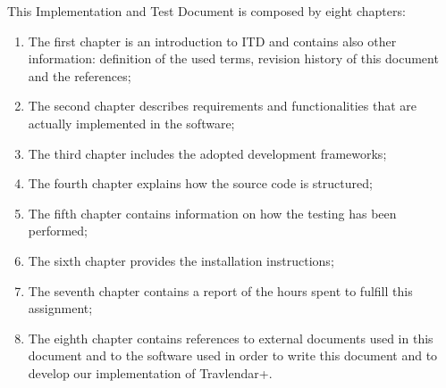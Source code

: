 This Implementation and Test Document is composed by eight chapters:
\begin{enumerate}
	\item The first chapter is an introduction to ITD and contains also other information: definition of the used terms, revision history of this document and the references;
	\item The second chapter describes requirements and functionalities that are actually implemented in the software;
	\item The third chapter includes the adopted
development frameworks;
	\item The fourth chapter explains how the source code is structured;
	\item The fifth chapter contains information
on how the testing has been performed;
	\item The sixth chapter provides the installation instructions;
	\item The seventh chapter contains a report of the hours spent to fulfill this assignment;
	\item The eighth chapter contains references to external documents used in this document and to the software used in order to write this document and to develop our implementation of Travlendar+.
\end{enumerate}
